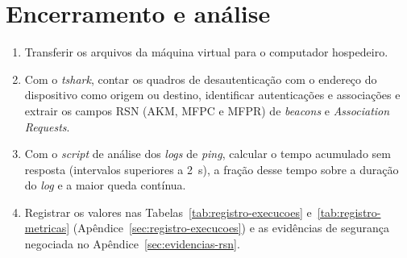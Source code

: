 \section{Encerramento e análise}

\begin{enumerate}
    \item Transferir os arquivos da máquina virtual para o computador hospedeiro.
    \item Com o \textit{tshark}, contar os quadros de desautenticação com o endereço do dispositivo como origem ou destino, identificar autenticações e associações e extrair os campos RSN (AKM, MFPC e MFPR) de \textit{beacons} e \textit{Association Requests}.
    \item Com o \textit{script} de análise dos \textit{logs} de \textit{ping}, calcular o tempo acumulado sem resposta (intervalos superiores a 2~s), a fração desse tempo sobre a duração do \textit{log} e a maior queda contínua.
    \item Registrar os valores nas Tabelas~\ref{tab:registro-execucoes} e~\ref{tab:registro-metricas} (Apêndice~\ref{sec:registro-execucoes}) e as evidências de segurança negociada no Apêndice~\ref{sec:evidencias-rsn}.
\end{enumerate}
